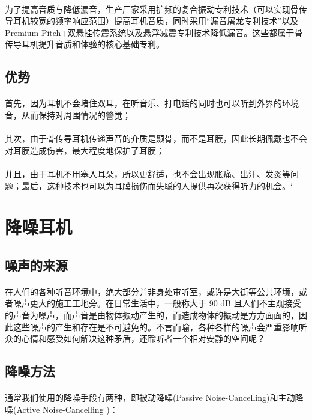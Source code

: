 \documentclass{ctexart}
\begin{document}
\paragraph{}
为了提高音质与降低漏音，生产厂家采用扩频的复合振动专利技术（可以实现骨传导耳机较宽的频率响应范围）提高耳机音质，同时采用“漏音屠龙专利技术”以及Premium  Pitch+双悬挂传震系统以及悬浮减震专利技术降低漏音。这些都属于骨传导耳机提升音质和体验的核心基础专利。
\subsection{优势}
\paragraph{}
首先，因为耳机不会堵住双耳，在听音乐、打电话的同时也可以听到外界的环境音，从而保持对周围情况的警觉；
\paragraph{}
其次，由于骨传导耳机传递声音的介质是颞骨，而不是耳膜，因此长期佩戴也不会对耳膜造成伤害，最大程度地保护了耳膜；
\paragraph{}
并且，由于耳机不用塞入耳朵，所以更舒适，也不会出现胀痛、出汗、发炎等问题；最后，这种技术也可以为耳膜损伤而失聪的人提供再次获得听力的机会。‘
\section{降噪耳机}
\subsection{噪声的来源}
\paragraph{}
在人们的各种听音环境中，绝大部分并非身处审听室，或许是大街等公共环境，或者噪声更大的施工工地旁。在日常生活中，一般称大于 90 dB 且人们不主观接受的声音为噪声，而声音是由物体振动产生的，而造成物体的振动是方方面面的，因此这些噪声的产生和存在是不可避免的。不言而喻，各种各样的噪声会严重影响听众的心情和感受如何解决这种矛盾，还聆听者一个相对安静的空间呢？
\subsection{降噪方法}
\paragraph{}
通常我们使用的降噪手段有两种，即被动降噪(Passive Noise-Cancelling)和主动降噪(Active Noise-Cancelling )：
\end{document}
